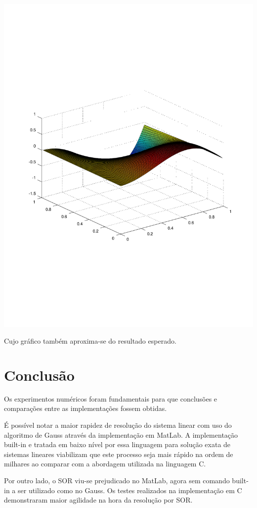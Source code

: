 \documentclass[
	article,			%
	11pt,				%
	oneside,			%
	a4paper,			%
	english,			%
	brazil,				%
	sumario=tradicional
	]{abntex2}
\begin{document}
\includegraphics[scale=0.5]{malha128eg}

Cujo gráfico também aproxima-se do resultado esperado.

\section{Conclusão}

Os experimentos numéricos foram fundamentais para que conclusões e comparações entre as implementações fossem obtidas.

É possível notar a maior rapidez de resolução do sistema linear com uso do algoritmo de Gauss através da implementação em MatLab. A implementação built-in e tratada em baixo nível por essa linguagem para solução exata de sistemas lineares viabilizam que este processo seja mais rápido na ordem de milhares ao comparar com a abordagem utilizada na linguagem C.

Por outro lado, o SOR viu-se prejudicado no MatLab, agora sem comando built-in a ser utilizado como no Gauss. Os testes realizados na implementação em C demonstraram maior agilidade na hora da resolução por SOR.
\end{document}
